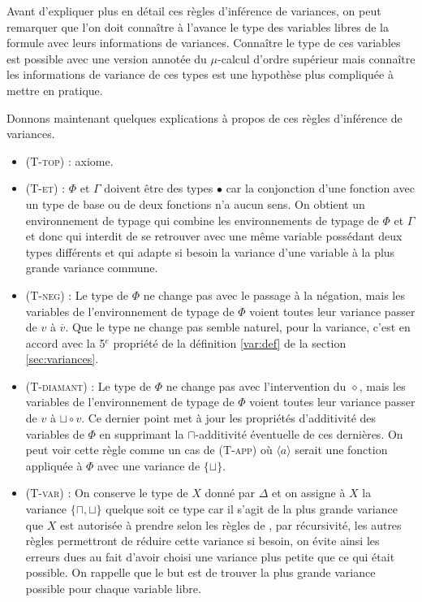 \documentclass{rapport}
\theoremstyle{plain}
\theoremstyle{remark}
\theoremstyle{definition}
\begin{document}
Avant d'expliquer plus en détail ces règles d'inférence de variances, on peut remarquer que l'on doit connaître à l'avance le type des variables libres de la formule avec leurs informations de variances. Connaître le type de ces variables est possible avec une version annotée du $\mu$-calcul d'ordre supérieur mais connaître les informations de variance de ces types est une hypothèse plus compliquée à mettre en pratique. 

Donnons maintenant quelques explications à propos de ces règles d'inférence de variances.
\begin{itemize}
	\item (\textsc{T-top}) : axiome.
	\item (\textsc{T-et}) : $\Phi$ et $\Gamma$ doivent être des types $\bullet$ car la conjonction d'une fonction avec un type de base ou de deux fonctions n'a aucun sens. On obtient un environnement de typage qui combine les environnements de typage de $\Phi$ et $\Gamma$ et donc qui interdit de se retrouver avec une même variable possédant deux types différents et qui adapte si besoin la variance d'une variable à la plus grande variance commune.
	\item (\textsc{T-neg}) : Le type de $\Phi$ ne change pas avec le passage à la négation, mais les variables de l'environnement de typage de $\Phi$ voient toutes leur variance passer de $v$ à $\overline{v}$. Que le type ne change pas semble naturel, pour la variance, c'est en accord avec la 5$^e$ propriété de la définition \ref{var:def} de la section \ref{sec:variances}.
	\item (\textsc{T-diamant}) : Le type de $\Phi$ ne change pas avec l'intervention du $\diamond$, mais les variables de l'environnement de typage de $\Phi$ voient toutes leur variance passer de $v$ à $\sqcup \circ v$. Ce dernier point met à jour les propriétés d'additivité des variables de $\Phi$ en supprimant la $\sqcap$-additivité éventuelle de ces dernières. On peut voir cette règle comme un cas de (\textsc{T-app}) où $\langle a \rangle$ serait une fonction appliquée à $\Phi$ avec une variance de $\{\sqcup\}$.
	\item (\textsc{T-var}) : On conserve le type de $X$ donné par $\Delta$ et on assigne à $X$ la variance $\{\sqcap, \sqcup\}$ quelque soit ce type car il s'agit de la plus grande variance que $X$ est autorisée à prendre selon les règles de \citep{lange2014model}, par récursivité, les autres règles permettront de réduire cette variance si besoin, on évite ainsi les erreurs dues au fait d'avoir choisi une variance plus petite que ce qui était possible. On rappelle que le but est de trouver la plus grande variance possible pour chaque variable libre.

\end{itemize}
\end{document}
